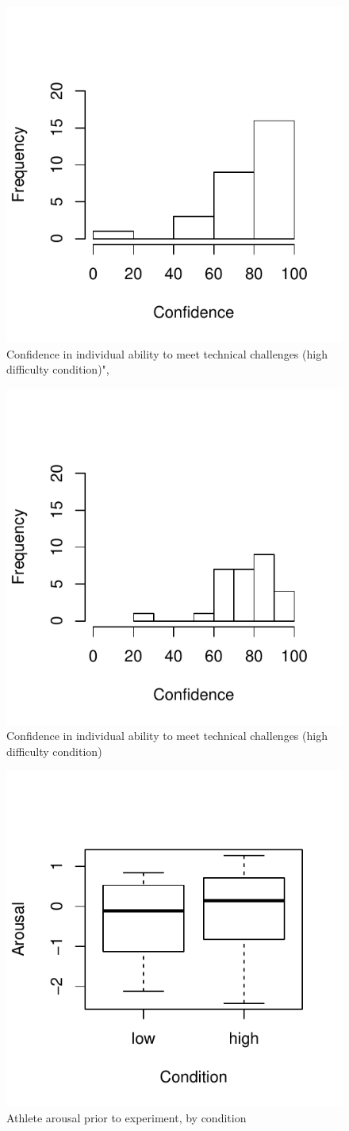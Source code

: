 \begin{figure}
  \centering
  \includegraphics[width=0.5\linewidth,keepaspectratio] {images/histHighIndConfidence-1}
  \caption{Confidence in individual ability to meet technical challenges (high difficulty condition)",}
  \label{fig:histHighIndConfidence}
\end{figure}

\begin{figure}
  \centering
  \includegraphics[width=0.5\linewidth,keepaspectratio] {images/histLowIndConfidence-1}
  \caption{Confidence in individual ability to meet technical challenges (high difficulty condition)}
  \label{fig:histLowIndConfidence}
\end{figure}

\begin{figure}
  \centering
  \includegraphics[width=0.5\linewidth,keepaspectratio] {images/arousalFactorPreBoxPlot-1}
  \caption{Athlete arousal prior to experiment, by condition}
        \label{fig:arousalFactorPreBoxPlot}
    \end{figure}

